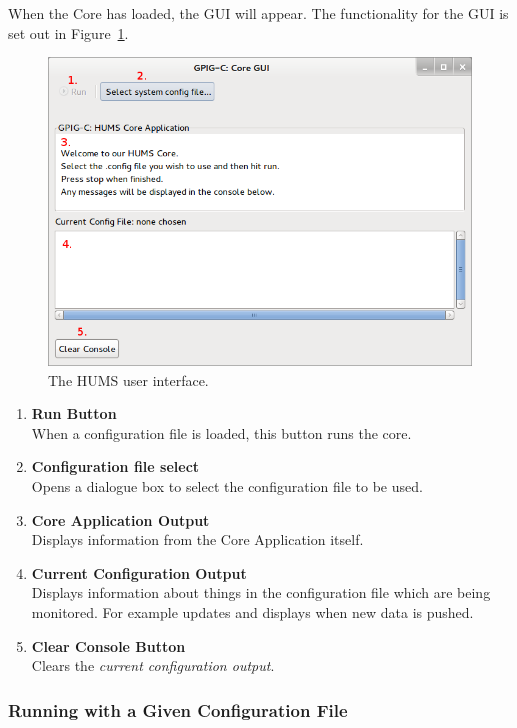 \documentclass[10pt,a4paper]{article}
\begin{document}
When the Core has loaded, the GUI will appear. The functionality for the GUI is set out in Figure~\ref{fig:manualgui}.
\begin{figure}[H]
  \centering
  \includegraphics[width=\textwidth]{images/manual-gui.png}
  \caption{The HUMS user interface.}
  \label{fig:manualgui}
\end{figure}
  \begin{enumerate}
\item \textbf{Run Button} \\ 
When a configuration file is loaded, this button runs the core.
\item \textbf{Configuration file select} \\ 
Opens a dialogue box to select the configuration file to be used.
\item \textbf{Core Application Output} \\ 
Displays information from the Core Application itself.
\item \textbf{Current Configuration Output} \\ 
Displays information about things in the configuration file which are being monitored. For example updates and displays when new data is pushed.
\item \textbf{Clear Console Button} \\ 
Clears the \emph{current configuration output}.
\end{enumerate}

\subsubsection{Running with a Given Configuration File}
\label{subsec:loadconf}
\end{document}
